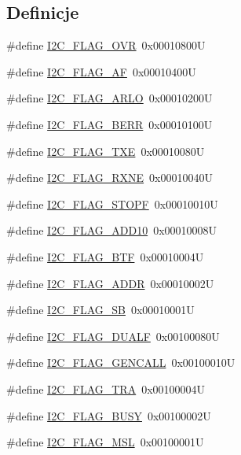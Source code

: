 \subsection*{Definicje}
\begin{DoxyCompactItemize}
\item 
\#define \hyperlink{group___i2_c___flag__definition_gab579673c8ac920db199aa7f18e547fb3}{I2\+C\+\_\+\+F\+L\+A\+G\+\_\+\+O\+VR}~0x00010800U
\item 
\#define \hyperlink{group___i2_c___flag__definition_ga2f89dbba9b964e6ade1480705e7a97d4}{I2\+C\+\_\+\+F\+L\+A\+G\+\_\+\+AF}~0x00010400U
\item 
\#define \hyperlink{group___i2_c___flag__definition_gae1e67936f4780e42b8bbe04ac9c20a7b}{I2\+C\+\_\+\+F\+L\+A\+G\+\_\+\+A\+R\+LO}~0x00010200U
\item 
\#define \hyperlink{group___i2_c___flag__definition_ga0454176b6ddd5c402abc3ef5953a21ad}{I2\+C\+\_\+\+F\+L\+A\+G\+\_\+\+B\+E\+RR}~0x00010100U
\item 
\#define \hyperlink{group___i2_c___flag__definition_gaeda14a3e9d02ff20a0d001bba9328f3d}{I2\+C\+\_\+\+F\+L\+A\+G\+\_\+\+T\+XE}~0x00010080U
\item 
\#define \hyperlink{group___i2_c___flag__definition_gad53c5b70a186f699f187c7a641ab0dac}{I2\+C\+\_\+\+F\+L\+A\+G\+\_\+\+R\+X\+NE}~0x00010040U
\item 
\#define \hyperlink{group___i2_c___flag__definition_gacc7d993963e199a6ddba391dab8da896}{I2\+C\+\_\+\+F\+L\+A\+G\+\_\+\+S\+T\+O\+PF}~0x00010010U
\item 
\#define \hyperlink{group___i2_c___flag__definition_ga316c78cbf34b74da96d69f702a0d1444}{I2\+C\+\_\+\+F\+L\+A\+G\+\_\+\+A\+D\+D10}~0x00010008U
\item 
\#define \hyperlink{group___i2_c___flag__definition_ga4dc3d44342007a5cd21c3baa0d938606}{I2\+C\+\_\+\+F\+L\+A\+G\+\_\+\+B\+TF}~0x00010004U
\item 
\#define \hyperlink{group___i2_c___flag__definition_ga5472d1196e934e0cc471aba8f66af416}{I2\+C\+\_\+\+F\+L\+A\+G\+\_\+\+A\+D\+DR}~0x00010002U
\item 
\#define \hyperlink{group___i2_c___flag__definition_gae009ab84be03fcc438625b1c39376ad4}{I2\+C\+\_\+\+F\+L\+A\+G\+\_\+\+SB}~0x00010001U
\item 
\#define \hyperlink{group___i2_c___flag__definition_ga3755b783aa73568659478c2e2e45e27f}{I2\+C\+\_\+\+F\+L\+A\+G\+\_\+\+D\+U\+A\+LF}~0x00100080U
\item 
\#define \hyperlink{group___i2_c___flag__definition_gab3a93b6840ad406c2fc09e0e96c59b88}{I2\+C\+\_\+\+F\+L\+A\+G\+\_\+\+G\+E\+N\+C\+A\+LL}~0x00100010U
\item 
\#define \hyperlink{group___i2_c___flag__definition_ga0359a5f960670d51cb17e659d32498ea}{I2\+C\+\_\+\+F\+L\+A\+G\+\_\+\+T\+RA}~0x00100004U
\item 
\#define \hyperlink{group___i2_c___flag__definition_ga50f69f043d99600221076100823b6ff3}{I2\+C\+\_\+\+F\+L\+A\+G\+\_\+\+B\+U\+SY}~0x00100002U
\item 
\#define \hyperlink{group___i2_c___flag__definition_gae8e6a404cbfd70420d278d520304f368}{I2\+C\+\_\+\+F\+L\+A\+G\+\_\+\+M\+SL}~0x00100001U
\end{DoxyCompactItemize}


